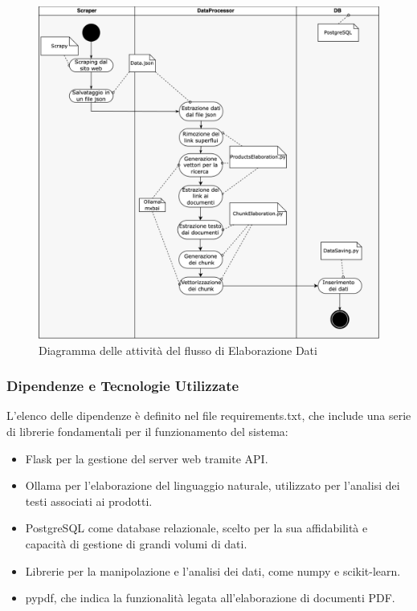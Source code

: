 \begin{figure}[H]
    \centering
    \includegraphics[width=\textwidth]{images/flussoSalvataggioDati.png}
    \caption{Diagramma delle attivit\`a del flusso di Elaborazione Dati}
    \label{fig:architettura}
\end{figure}


\subsubsection{ Dipendenze e Tecnologie Utilizzate}
L’elenco delle dipendenze è definito nel file requirements.txt, che include una serie di librerie fondamentali per il funzionamento del sistema:

\begin{itemize}
    
\item Flask per la gestione del server web tramite API.

\item Ollama per l’elaborazione del linguaggio naturale,  utilizzato per l'analisi dei testi associati ai prodotti.

\item PostgreSQL come database relazionale, scelto per la sua affidabilità e capacità di gestione di grandi volumi di dati.

\item Librerie per la manipolazione e l'analisi dei dati, come numpy e scikit-learn.

\item pypdf, che indica la funzionalità legata all'elaborazione di documenti PDF.

\end{itemize}